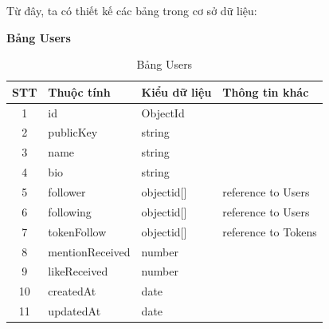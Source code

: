 \clearpage
\hspace{-1cm}Từ đây, ta có thiết kế các bảng trong cơ sở dữ liệu:



\hspace{-1cm}\textbf{Bảng Users}
\begin{table}[H]
    \centering
    \begin{tabular}{|c|l|l|l|}
        \hline
        STT & Thuộc tính      & Kiểu dữ liệu & Thông tin khác      \\
        \hline
        1   & id              & ObjectId     &                     \\
        \hline
        2   & publicKey       & string       &                     \\
        \hline
        3   & name            & string       &                     \\
        \hline
        4   & bio             & string       &                     \\
        \hline
        5   & follower        & objectid[]   & reference to Users  \\
        \hline
        6   & following       & objectid[]   & reference to Users  \\
        \hline
        7   & tokenFollow     & objectid[]   & reference to Tokens \\
        \hline
        8   & mentionReceived & number       &                     \\
        \hline
        9   & likeReceived    & number       &                     \\
        \hline
        10  & createdAt       & date         &                     \\
        \hline
        11  & updatedAt       & date         &                     \\
        \hline
    \end{tabular}
    \caption{Bảng Users}
    \label{tab:fee-adjustment}
\end{table}

